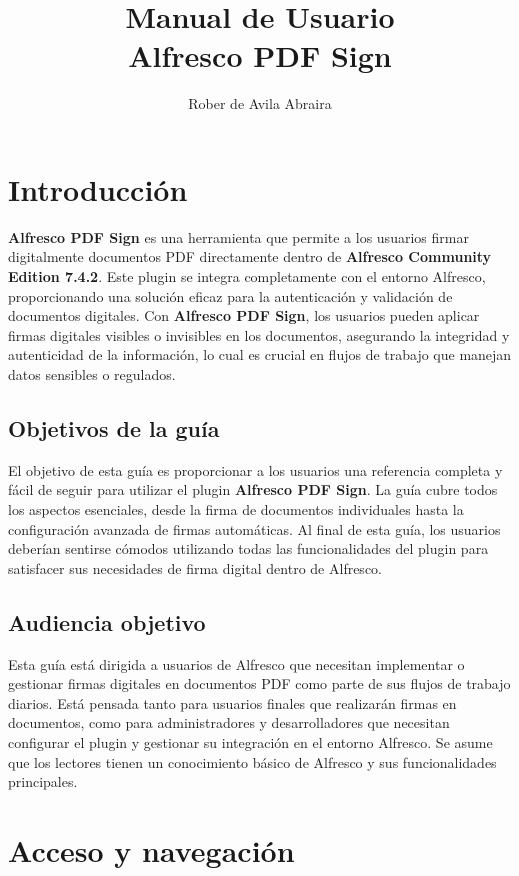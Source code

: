 \documentclass{template/ol-softwaremanual}
\title{Manual de Usuario \\ Alfresco PDF Sign}
\author{Rober de Avila Abraira}
\begin{document}
\maketitle

\tableofcontents
\newpage


\section{Introducción}

\textbf{Alfresco PDF Sign} es una herramienta que permite a los usuarios firmar digitalmente documentos PDF directamente dentro de \textbf{Alfresco Community Edition 7.4.2}. Este plugin se integra completamente con el entorno Alfresco, proporcionando una solución eficaz para la autenticación y validación de documentos digitales. Con \textbf{Alfresco PDF Sign}, los usuarios pueden aplicar firmas digitales visibles o invisibles en los documentos, asegurando la integridad y autenticidad de la información, lo cual es crucial en flujos de trabajo que manejan datos sensibles o regulados.


\subsection{Objetivos de la guía}
El objetivo de esta guía es proporcionar a los usuarios una referencia completa y fácil de seguir para utilizar el plugin \textbf{Alfresco PDF Sign}. La guía cubre todos los aspectos esenciales, desde la firma de documentos individuales hasta la configuración avanzada de firmas automáticas. Al final de esta guía, los usuarios deberían sentirse cómodos utilizando todas las funcionalidades del plugin para satisfacer sus necesidades de firma digital dentro de Alfresco.

\subsection{Audiencia objetivo}
Esta guía está dirigida a usuarios de Alfresco que necesitan implementar o gestionar firmas digitales en documentos PDF como parte de sus flujos de trabajo diarios. Está pensada tanto para usuarios finales que realizarán firmas en documentos, como para administradores y desarrolladores que necesitan configurar el plugin y gestionar su integración en el entorno Alfresco. Se asume que los lectores tienen un conocimiento básico de Alfresco y sus funcionalidades principales.

\section{Acceso y navegación}
\end{document}
